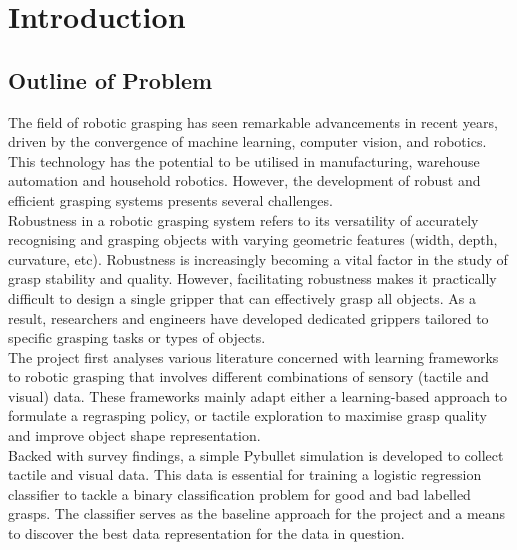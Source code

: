 \documentclass[11pt, a4paper]{report}
\theoremstyle{definition}
\begin{document}
\tableofcontents
\setcounter{page}{1}


\chapter{Introduction}
\label{chap:1}

\section{Outline of Problem}
\label{sec:1.1}
The field of robotic grasping has seen remarkable advancements in recent years, driven by the convergence of machine learning, computer vision, and robotics. This technology has the potential to be utilised in manufacturing, warehouse automation and household robotics. However, the development of robust and efficient grasping systems presents several challenges.\\

Robustness in a robotic grasping system refers to its versatility of accurately recognising and grasping objects with varying geometric features (width, depth, curvature, etc). Robustness is increasingly becoming a vital factor in the study of grasp stability and quality. However, facilitating robustness makes it practically difficult to design a single gripper that can effectively grasp all objects. As a result, researchers and engineers have developed dedicated grippers tailored to specific grasping tasks or types of objects.\\

The project first analyses various literature concerned with learning frameworks to robotic grasping that involves different combinations of sensory (tactile and visual) data. These frameworks mainly adapt either a learning-based approach to formulate a regrasping policy, or tactile exploration to maximise grasp quality and improve object shape representation.\\

Backed with survey findings, a simple Pybullet simulation is developed to collect tactile and visual data. This data is essential for training a logistic regression classifier to tackle a binary classification problem for good and bad labelled grasps. The classifier serves as the baseline approach for the project and a means to discover the best data representation for the data in question.\\
\end{document}

